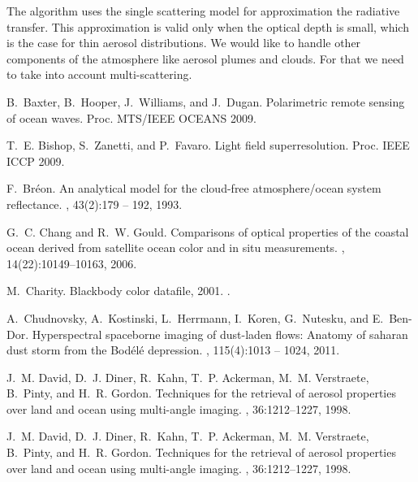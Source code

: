 \documentclass[10pt,twocolumn,letterpaper]{article}
\begin{document}
The algorithm uses the single scattering model for
approximation the radiative transfer. This approximation is valid only
when the
optical depth is small, which is the case for thin aerosol distributions.
We would like to handle other components of the atmosphere like aerosol
plumes and clouds. For that we need to take into account multi-scattering.



{\small
%
%

\begin{thebibliography}{10}\itemsep=-1pt

B.~Baxter, B.~Hooper, J.~Williams, and J.~Dugan.
\newblock Polarimetric remote sensing of ocean waves.
\newblock Proc. MTS/IEEE OCEANS 2009.

T.~E. Bishop, S.~Zanetti, and P.~Favaro.
\newblock Light field superresolution.
Proc. IEEE ICCP 2009.

F.~Br\'{e}on.
\newblock An analytical model for the cloud-free atmosphere/ocean system
  reflectance.
, 43(2):179 -- 192, 1993.

G.~C. Chang and R.~W. Gould.
\newblock Comparisons of optical properties of the coastal ocean derived from
  satellite ocean color and in situ measurements.
, 14(22):10149--10163, 2006.

M.~Charity.
\newblock Blackbody color datafile, 2001.
.

A.~Chudnovsky, A.~Kostinski, L.~Herrmann, I.~Koren, G.~Nutesku, and E.~Ben-Dor.
\newblock Hyperspectral spaceborne imaging of dust-laden flows: Anatomy of
  saharan dust storm from the Bod\'{e}l\'{e} depression.
, 115(4):1013 -- 1024, 2011.

J.~M. David, D.~J. Diner, R.~Kahn, T.~P. Ackerman, M.~M. Verstraete, B.~Pinty,
  and H.~R. Gordon.
\newblock Techniques for the retrieval of aerosol properties over land and
  ocean using multi-angle imaging.
,
  36:1212--1227, 1998.

J.~M. David, D.~J. Diner, R.~Kahn, T.~P. Ackerman, M.~M. Verstraete, B.~Pinty,
  and H.~R. Gordon.
\newblock Techniques for the retrieval of aerosol properties over land and
  ocean using multi-angle imaging.
,
  36:1212--1227, 1998.


\end{thebibliography}}
\end{document}
